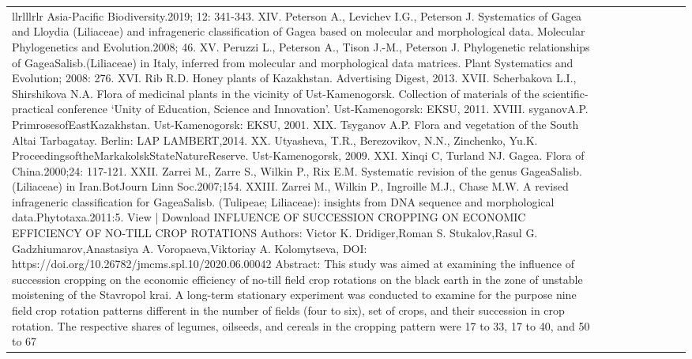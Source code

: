 \begin{longtable}{lllllllll}{llrlllrlr}
Asia-Pacific Biodiversity.2019; 12: 341-343.  XIV. Peterson A., Levichev I.G., Peterson J. Systematics of Gagea and Lloydia (Liliaceae) and infrageneric classification of Gagea based on molecular and morphological data. Molecular Phylogenetics and Evolution.2008; 46.  XV. Peruzzi L., Peterson A., Tison J.-M., Peterson J. Phylogenetic relationships of GageaSalisb.(Liliaceae) in Italy, inferred from molecular and morphological data matrices. Plant Systematics and Evolution; 2008: 276.  XVI. Rib R.D. Honey plants of Kazakhstan. Advertising Digest, 2013.  XVII. Scherbakova L.I., Shirshikova N.A. Flora of medicinal plants in the vicinity of Ust-Kamenogorsk. Collection of materials of the scientific-practical conference ‘Unity of Education, Science and Innovation’. Ust-Kamenogorsk: EKSU, 2011.  XVIII. syganovA.P. PrimrosesofEastKazakhstan. Ust-Kamenogorsk: EKSU, 2001.  XIX. Tsyganov A.P. Flora and vegetation of the South Altai Tarbagatay. Berlin: LAP LAMBERT,2014.  XX. Utyasheva, T.R., Berezovikov, N.N., Zinchenko, Yu.K. ProceedingsoftheMarkakolskStateNatureReserve. Ust-Kamenogorsk, 2009.  XXI. Xinqi C, Turland NJ. Gagea. Flora of China.2000;24: 117-121.  XXII. Zarrei M., Zarre S., Wilkin P., Rix E.M. Systematic revision of the genus GageaSalisb. (Liliaceae) in Iran.BotJourn Linn Soc.2007;154.  XXIII. Zarrei M., Wilkin P., Ingroille M.J., Chase M.W. A revised infrageneric classification for GageaSalisb. (Tulipeae; Liliaceae): insights from DNA sequence and morphological data.Phytotaxa.2011:5. View | Download INFLUENCE OF SUCCESSION CROPPING ON ECONOMIC EFFICIENCY OF NO-TILL CROP ROTATIONS Authors: Victor K. Dridiger,Roman S. Stukalov,Rasul G. Gadzhiumarov,Anastasiya A. Voropaeva,Viktoriay A. Kolomytseva, DOI: https://doi.org/10.26782/jmcms.spl.10/2020.06.00042	 Abstract:  This study was aimed at examining the influence of succession cropping on the economic efficiency of no-till field crop rotations on the black earth in the zone of unstable moistening of the Stavropol krai. A long-term stationary experiment was conducted to examine for the purpose nine field crop rotation patterns different in the number of fields (four to six), set of crops, and their succession in crop rotation. The respective shares of legumes, oilseeds, and cereals in the cropping pattern were 17 to 33, 17 to 40, and 50 to 67 %
\end{longtable}
